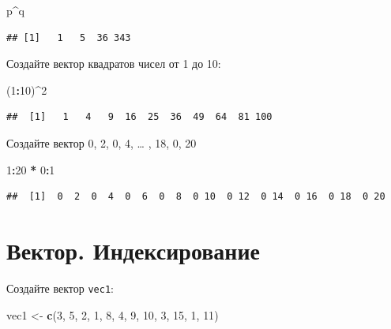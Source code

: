 \documentclass[]{book}
\newenvironment{Shaded}{\begin{snugshade}}{\end{snugshade}}
\newcommand{\KeywordTok}[1]{\textcolor[rgb]{0.13,0.29,0.53}{\textbf{#1}}}
\newcommand{\DecValTok}[1]{\textcolor[rgb]{0.00,0.00,0.81}{#1}}
\newcommand{\StringTok}[1]{\textcolor[rgb]{0.31,0.60,0.02}{#1}}
\newcommand{\OperatorTok}[1]{\textcolor[rgb]{0.81,0.36,0.00}{\textbf{#1}}}
\newcommand{\NormalTok}[1]{#1}
\begin{document}
\begin{Shaded}
\begin{Highlighting}[]
\NormalTok{p}\OperatorTok{^}\NormalTok{q}
\end{Highlighting}
\end{Shaded}

\begin{verbatim}
## [1]   1   5  36 343
\end{verbatim}

Создайте вектор квадратов чисел от 1 до 10:

\begin{Shaded}
\begin{Highlighting}[]
\NormalTok{(}\DecValTok{1}\OperatorTok{:}\DecValTok{10}\NormalTok{)}\OperatorTok{^}\DecValTok{2}
\end{Highlighting}
\end{Shaded}

\begin{verbatim}
##  [1]   1   4   9  16  25  36  49  64  81 100
\end{verbatim}

Создайте вектор 0, 2, 0, 4, \ldots{} , 18, 0, 20

\begin{Shaded}
\begin{Highlighting}[]
\DecValTok{1}\OperatorTok{:}\DecValTok{20} \OperatorTok{*}\StringTok{ }\DecValTok{0}\OperatorTok{:}\DecValTok{1}
\end{Highlighting}
\end{Shaded}

\begin{verbatim}
##  [1]  0  2  0  4  0  6  0  8  0 10  0 12  0 14  0 16  0 18  0 20
\end{verbatim}

\section{Вектор. Индексирование}\label{solvvec_task_2}

Создайте вектор \texttt{vec1}:

\begin{Shaded}
\begin{Highlighting}[]
\NormalTok{vec1 <-}\StringTok{ }\KeywordTok{c}\NormalTok{(}\DecValTok{3}\NormalTok{, }\DecValTok{5}\NormalTok{, }\DecValTok{2}\NormalTok{, }\DecValTok{1}\NormalTok{, }\DecValTok{8}\NormalTok{, }\DecValTok{4}\NormalTok{, }\DecValTok{9}\NormalTok{, }\DecValTok{10}\NormalTok{, }\DecValTok{3}\NormalTok{, }\DecValTok{15}\NormalTok{, }\DecValTok{1}\NormalTok{, }\DecValTok{11}\NormalTok{)}
\end{Highlighting}
\end{Shaded}
\end{document}
